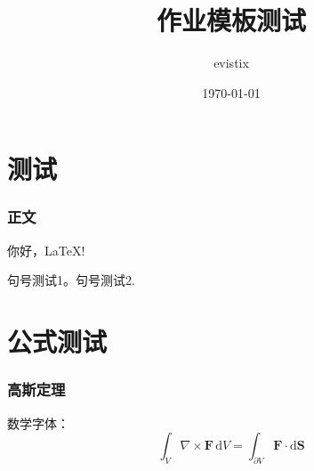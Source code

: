 \documentclass[theme = fancy, zihao = 5]{work-template}
\title{作业模板测试}
\author{evistix}
\date{\today}
\begin{document}
\maketitle

\part{测试}
\section{正文}
你好，\LaTeX!\par
句号测试1。句号测试2.

\part{公式测试}
\section{高斯定理}

数学字体：
\begin{equation}
    \int_V \nabla\times \symbf F\,\mathrm{d}V = \int_{\partial V} \symbf F\cdot\mathrm{d}\symbf S 
\end{equation}
\end{document}
